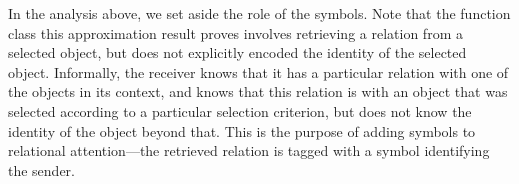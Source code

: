 In the analysis above, we set aside the role of the symbols. Note that the function class this approximation result proves involves retrieving a relation from a selected object, but does not explicitly encoded the identity of the selected object. Informally, the receiver knows that it has a particular relation with one of the objects in its context, and knows that this relation is with an object that was selected according to a particular selection criterion, but does not know the identity of the object beyond that. This is the purpose of adding symbols to relational attention---the retrieved relation is tagged with a symbol identifying the sender.
